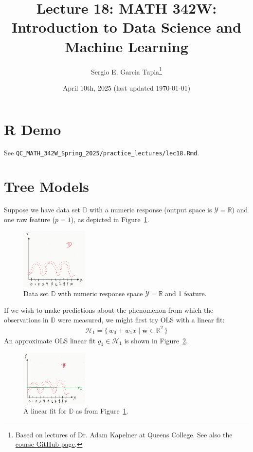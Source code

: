 \documentclass[12pt, a4paper]{article}
\title{Lecture 18: MATH 342W: Introduction to Data Science and Machine Learning}
\author{Sergio E. Garcia Tapia\thanks{Based on lectures of Dr. Adam Kapelner at Queens College.
See also the \href{https://github.com/kapelner/QC_MATH_342W_Spring_2025}{course GitHub page}.}}
\date{April 10th, 2025 (last updated \today)}
\theoremstyle{definition}
\begin{document}
	\maketitle
	\section*{R Demo}
	See \verb|QC_MATH_342W_Spring_2025/practice_lectures/lec18.Rmd|.
	\section*{Tree Models}
	Suppose we have data set $\mathbb{D}$ with a numeric response (output space
	is $\mathcal{Y}=\mathbb{R}$) and one raw feature ($p = 1$), as depicted in 
	Figure~\ref{fig:data-set-numeric-response-1-feature}.
	\begin{figure}
		\centering
		\includegraphics[width=0.3\textwidth]{data-set-numeric-response-1-feature}
		\caption{Data set $\mathbb{D}$ with numeric response space $\mathcal{Y}=\mathbb{R}$
			and 1 feature.}
		\label{fig:data-set-numeric-response-1-feature}
	\end{figure}
	If we wish to make predictions about the phenomenon from which the observations
	in $\mathbb{D}$ were measured, we might first try OLS with a linear fit:
	\begin{align*}
		\mathcal{H}_1 = \{\,
		w_0 + w_1 x \mid \bm{w}\in \mathbb{R}^2
		\,\}
	\end{align*}
	An approximate OLS linear fit $g_1\in \mathcal{H}_1$ is shown in
	Figure~\ref{fig:data-set-numeric-response-1-feature-linear}.
	\begin{figure}
		\centering
		\includegraphics[width=0.3\textwidth]{data-set-numeric-response-1-feature-ols-linear}
		\caption{A linear fit for $\mathbb{D}$ as from Figure~\ref{fig:data-set-numeric-response-1-feature}.}
		\label{fig:data-set-numeric-response-1-feature-linear}
	\end{figure}
\end{document}
